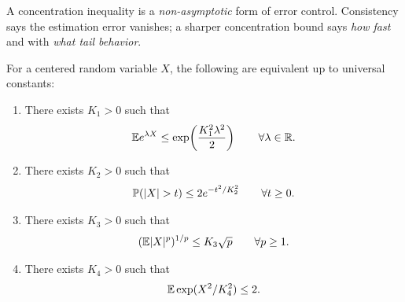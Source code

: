 \begin{remark}
A concentration inequality is a \emph{non-asymptotic} form of error control.  
Consistency says the estimation error vanishes; a sharper concentration bound says \emph{how fast} and with \emph{what tail behavior}.
\end{remark}



\begin{prop}
For a centered random variable $X$, the following are equivalent up to universal constants:
\begin{enumerate}[label=(\roman*)]
    \item There exists $K_1>0$ such that
    \[
    \mathbb{E} e^{\lambda X}\le \exp\!\left(\frac{K_1^2\lambda^2}{2}\right)
    \qquad \forall \lambda\in\mathbb{R}.
    \]
    \item There exists $K_2>0$ such that
    \[
    \pr(|X|>t)\le 2e^{-t^2/K_2^2}
    \qquad \forall t\ge 0.
    \]
    \item There exists $K_3>0$ such that
    \[
    (\mathbb{E} |X|^p)^{1/p}\le K_3\sqrt{p}
    \qquad \forall p\ge 1.
    \]
    \item There exists $K_4>0$ such that
    \[
    \mathbb{E} \exp(X^2/K_4^2)\le 2.
    \]
\end{enumerate}
\end{prop}
